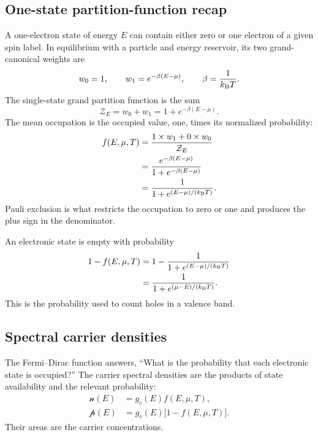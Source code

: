 \subsection{One-state partition-function recap}

A one-electron state of energy $E$ can contain either zero or one electron of a
given spin label.  In equilibrium with a particle and energy reservoir, its two
grand-canonical weights are
\begin{equation}
  w_0=1,
  \qquad
  w_1=e^{-\beta(E-\mu)},
  \qquad
  \beta=\frac{1}{k_{\mathrm B} T}.
  \label{eq:single-fermion-state-weights}
\end{equation}
The single-state grand partition function is the sum
\begin{equation}
  \mathcal Z_E=w_0+w_1
  =1+e^{-\beta(E-\mu)}.
  \label{eq:single-fermion-grand-partition}
\end{equation}
The mean occupation is the occupied value, one, times its normalized
probability:
\begin{equation}
\begin{aligned}
  f(E,\mu,T)
  &=\frac{1\times w_1+0\times w_0}{\mathcal Z_E}\\
  &=\frac{e^{-\beta(E-\mu)}}
          {1+e^{-\beta(E-\mu)}}\\
  &=\frac{1}{1+e^{(E-\mu)/(k_{\mathrm B} T)}}.
\end{aligned}
  \label{eq:fermi-dirac-from-single-state-partition}
\end{equation}
Pauli exclusion is what restricts the occupation to zero or one and produces
the plus sign in the denominator.

An electronic state is empty with probability
\begin{equation}
\begin{aligned}
  1-f(E,\mu,T)
  &=1-\frac{1}{1+e^{(E-\mu)/(k_{\mathrm B} T)}}\\
  &=\frac{1}{1+e^{(\mu-E)/(k_{\mathrm B} T)}}.
\end{aligned}
  \label{eq:empty-state-probability}
\end{equation}
This is the probability used to count holes in a valence band.

\subsection{Spectral carrier densities}

The Fermi--Dirac function answers, ``What is the probability that each
electronic state is occupied?''  The carrier spectral densities are the
products of state availability and the relevant probability:
\begin{align}
  \mathcal n(E)&=g_c(E)f(E,\mu,T),
  \label{eq:electron-spectral-density}\\
  \mathcal p(E)&=g_v(E)\bigl[1-f(E,\mu,T)\bigr].
  \label{eq:hole-spectral-density}
\end{align}
Their areas are the carrier concentrations.

